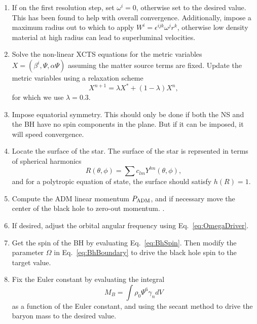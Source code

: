 \begin{enumerate}
\item If on the first resolution step, set $\omega^i=0$, otherwise set
  to the desired value. This has been found to help with overall convergence. Additionally, impose a maximum radius out to which to apply $W^i=\epsilon^{ijk}\omega^jr^k$, otherwise low density material at high radius can lead to superluminal velocities.

\item Solve the non-linear XCTS equations for the metric variables
  $X=\left(\beta^i,\Psi,\alpha\Psi\right)$ assuming the matter source
  terms are fixed. Update the metric variables using a relaxation
  scheme
\begin{equation}
X^{n+1}=\lambda X^{*} + (1-\lambda)X^n,
\end{equation}
for which we use $\lambda=0.3$.

\item Impose equatorial symmetry. This should only be done if both the
  NS and the BH have no spin components in the plane. But if it can be
  imposed, it will speed convergence.

\item Locate the surface of the star. The surface of the star is
  reprsented in terms of spherical harmonics
\begin{equation}
R(\theta,\phi)=\sum c_{lm}Y^{lm}(\theta,\phi)
,
\end{equation}
and for a polytropic equation of state, the surface
should satisfy $h(R)=1$. 

\item Compute the ADM linear momentum $P_{\rm ADM}$, and if necessary
  move the center of the black hole to zero-out momentum. .

\item If desired, adjust the orbital angular frequency using Eq.~\ref{eq:OmegaDriver}.

\item Get the spin of the BH by evaluating Eq.~\ref{eq:BhSpin}. Then
  modify the parameter $\Omega$ in Eq.~\ref{eq:BhBoundary} to drive
  the black hole spin to the target value.

\item Fix the Euler constant by evaluating the integral
\begin{equation}
M_{B}=\int \rho_0\Psi^6\gamma_ndV
\end{equation}
as a function of the Euler
constant, and using the secant method to drive the baryon mass to the
desired value.


\end{enumerate}
